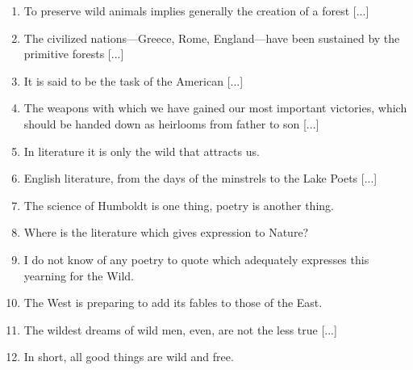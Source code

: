 \documentclass[twoside,openright,10pt]{memoir} %
\begin{document}
\begin{enumerate}
\item To preserve wild animals implies generally the creation of a forest [...] \EBGaramond{}\textlangle\normalfont {} \thecount \EBGaramond{}\textrangle \normalfont
\item The civilized nations—Greece, Rome, England—have been sustained by the primitive forests [...] \EBGaramond{}\textlangle\normalfont {} \thecount \EBGaramond{}\textrangle \normalfont
\item It is said to be the task of the American [...] \EBGaramond{}\textlangle\normalfont {} \thecount \EBGaramond{}\textrangle \normalfont
\item The weapons with which we have gained our most important victories, which should be handed down as heirlooms from father to son [...] \EBGaramond{}\textlangle\normalfont {} \thecount \EBGaramond{}\textrangle \normalfont
\item In literature it is only the wild that attracts us. \EBGaramond{}\textlangle\normalfont {} \thecount \EBGaramond{}\textrangle \normalfont
\item English literature, from the days of the minstrels to the Lake Poets [...] \EBGaramond{}\textlangle\normalfont {} \thecount \EBGaramond{}\textrangle \normalfont
\item The science of Humboldt is one thing, poetry is another thing. \EBGaramond{}\textlangle\normalfont {} \thecount \EBGaramond{}\textrangle \normalfont
\item Where is the literature which gives expression to Nature? \EBGaramond{}\textlangle\normalfont {} \thecount \EBGaramond{}\textrangle \normalfont
\item I do not know of any poetry to quote which adequately expresses this yearning for the Wild. \EBGaramond{}\textlangle\normalfont {} \thecount \EBGaramond{}\textrangle \normalfont
\item The West is preparing to add its fables to those of the East. \EBGaramond{}\textlangle\normalfont {} \thecount \EBGaramond{}\textrangle \normalfont
\item The wildest dreams of wild men, even, are not the less true [...] \EBGaramond{}\textlangle\normalfont {} \thecount \EBGaramond{}\textrangle \normalfont
\item In short, all good things are wild and free. \EBGaramond{}\textlangle\normalfont {} \thecount \EBGaramond{}\textrangle \normalfont

\end{enumerate}
\end{document}
